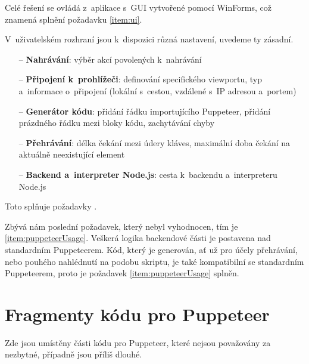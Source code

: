 \documentclass[12pt, a4paper, twoside]{article}
\begin{document}
	Celé řešení se ovládá z~aplikace s~GUI vytvořené pomocí WinForms, což znamená splnění požadavku \cref{item:ui}.%
	
	V~uživatelském rozhraní jsou k~dispozici různá nastavení, uvedeme ty zásadní.
	\begin{itemize}
		\item[--] \textbf{Nahrávání}: výběr akcí povolených k~nahrávání
		\item[--] \textbf{Připojení k~prohlížeči}: definování specifického viewportu, typ a~informace o~připojení  (lokální s~cestou, vzdálené s~IP adresou a~portem)
		\item[--] \textbf{Generátor kódu}: přidání řádku importujícího Puppeteer, přidání prázdného řádku mezi bloky kódu, zachytávání chyby
		\item[--] \textbf{Přehrávání}: délka čekání mezi údery kláves, maximální doba čekání na aktuálně neexistující element
		\item[--] \textbf{Backend a~interpreter Node.js}: cesta k~backendu a~interpreteru Node.js
	\end{itemize}
	Toto splňuje požadavky .
	
	Zbývá nám poslední požadavek, který nebyl vyhodnocen, tím je \cref{item:puppeteerUsage}. Veškerá logika backendové části je postavena nad standardním Puppeteerem. Kód, který je generován, ať už pro účely přehrávání, nebo pouhého nahlédnutí na podobu skriptu, je také kompatibilní se standardním Puppeteerem, proto je požadavek \cref{item:puppeteerUsage} splněn.
	\newpage
	\setcounter{secnumdepth}{2}
	\setcounter{section}{0}
	\appendix
	\section{Fragmenty kódu pro Puppeteer}
	\label{appx:puppeteerCode}
	Zde jsou umístěny části kódu pro Puppeteer, které nejsou považovány za nezbytné, případně jsou příliš dlouhé.
\end{document}

